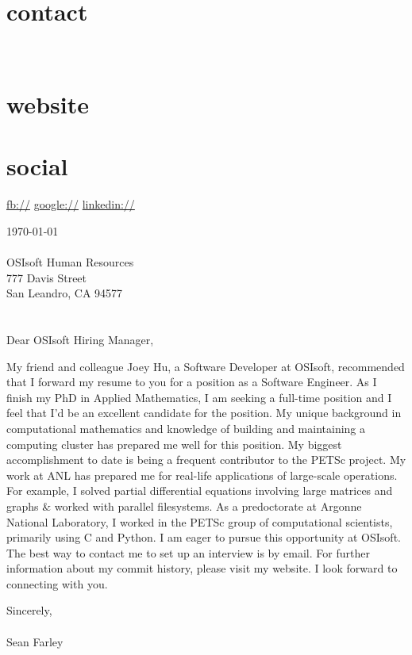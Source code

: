 \documentclass[]{fancy-cv}
\begin{document}

\begin{aside}
  \section{contact}
    \href{mailto:\myemail}{\myemail}
    ~
    \myphone
    ~
    \myaddress
    \mycity
  \section{website}
    \href{\mywebsite}{\mywebsite}
  \section{social}
    \href{http://facebook.com/\myfb}{fb://\myfb}
    \href{http://plug.google.com/\mygp}{google://\mygp}
    \href{http://www.linkedin.com/in/\mylinkedin}{linkedin://\mylinkedin}
\end{aside}

\vspace{.8em}
\large
\today\\
\\
OSIsoft Human Resources\\
777 Davis Street\\
San Leandro, CA 94577\\
\\
\\
Dear OSIsoft Hiring Manager,

My friend and colleague Joey Hu, a Software Developer at OSIsoft, recommended
that I forward my resume to you for a position as a Software Engineer. As I
finish my PhD in Applied Mathematics, I am seeking a full-time position and I
feel that I’d be an excellent candidate for the position.
%
\newline\newline
%
My unique background in computational mathematics and knowledge of building and
maintaining a computing cluster has prepared me well for this position. My
biggest accomplishment to date is being a frequent contributor to the PETSc
project.
%
\newline\newline
%
My work at ANL has prepared me for real-life applications of large-scale
operations. For example, I solved partial differential equations involving
large matrices and graphs \& worked with parallel filesystems. As a
predoctorate at Argonne National Laboratory, I worked in the PETSc group of
computational scientists, primarily using C and Python.
%
\newline\newline
%
I am eager to pursue this opportunity at OSIsoft. The best way to contact me to
set up an interview is by email. For further information about my commit
history, please visit my website. I look forward to connecting with you.

\vspace{2em}
Sincerely,\\
\\
Sean Farley
\end{document}
